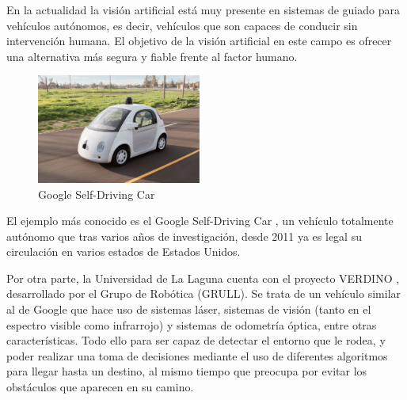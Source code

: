 


En la actualidad la visión artificial está muy presente en sistemas de guiado
para vehículos autónomos, es decir, vehículos que son capaces de conducir sin
intervención humana. El objetivo de la visión artificial en este campo es
ofrecer una alternativa más segura y fiable frente al factor humano.

\begin{figure}
  \vspace{-20pt}
  \begin{center}
    \includegraphics[width=0.48\textwidth]{images/cap1/GoogleSelf-DrivingCar.eps}
  \end{center}
  \vspace{-20pt}
  \caption{Google Self-Driving Car}
  \vspace{-10pt}
  \label{fig:GoogleSelf-DrivingCar}
\end{figure}

El ejemplo más conocido es el Google Self-Driving Car \cite{GoogleCar}, un
vehículo totalmente autónomo que tras varios años de investigación, desde 2011
ya es legal su circulación en varios estados de Estados Unidos.

Por otra parte, la Universidad de La Laguna cuenta con el proyecto VERDINO
\cite{ProjectPerenquen}, desarrollado por el Grupo de Robótica (GRULL). Se trata
de un vehículo similar al de Google que hace uso de sistemas láser, sistemas de
visión (tanto en el espectro visible como infrarrojo) y sistemas de odometría
óptica, entre otras características. Todo ello para ser capaz de detectar el
entorno que le rodea, y poder realizar una toma de decisiones mediante el uso de
diferentes algoritmos para llegar hasta un destino, al mismo tiempo que preocupa
por evitar los obstáculos que aparecen en su camino.

